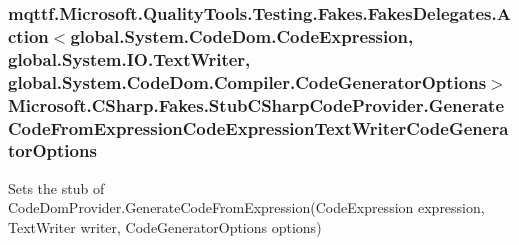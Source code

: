 \hypertarget{class_microsoft_1_1_c_sharp_1_1_fakes_1_1_stub_c_sharp_code_provider_aebc35ab5293803fceac07050abee2ac4}{
\subsubsection[{Generate\-Code\-From\-Expression\-Code\-Expression\-Text\-Writer\-Code\-Generator\-Options}]{\setlength{\rightskip}{0pt plus 5cm}mqttf.\-Microsoft.\-Quality\-Tools.\-Testing.\-Fakes.\-Fakes\-Delegates.\-Action$<$global.\-System.\-Code\-Dom.\-Code\-Expression, global.\-System.\-I\-O.\-Text\-Writer, global.\-System.\-Code\-Dom.\-Compiler.\-Code\-Generator\-Options$>$ Microsoft.\-C\-Sharp.\-Fakes.\-Stub\-C\-Sharp\-Code\-Provider.\-Generate\-Code\-From\-Expression\-Code\-Expression\-Text\-Writer\-Code\-Generator\-Options}}\label{class_microsoft_1_1_c_sharp_1_1_fakes_1_1_stub_c_sharp_code_provider_aebc35ab5293803fceac07050abee2ac4}


Sets the stub of Code\-Dom\-Provider.\-Generate\-Code\-From\-Expression(\-Code\-Expression expression, Text\-Writer writer, Code\-Generator\-Options options)

